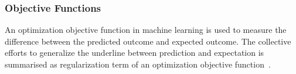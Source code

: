 \subsubsection{Objective Functions}
An optimization objective function in machine learning is used to measure the difference between the predicted outcome and expected outcome. The collective efforts to generalize the underline between prediction and expectation is summarised as regularization term of an optimization objective function~\cite{goodfellow_2015}.  